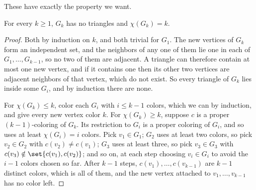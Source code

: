\begin{figure}[H]
    \centering
\end{figure}

These have exactly the property we want.

\begin{boxproposition} \label{Ch1:Prop:Zykov}
    For every $k \geq 1$, $G_k$ has no triangles and $\chi(G_k) = k$.
\end{boxproposition}
\begin{proof}
    Both by induction on $k$, and both trivial for $G_1$. The new vertices of $G_k$ form an independent set, and the neighbors of any one of them lie one in each of $G_1, \ldots, G_{k-1}$, so no two of them are adjacent. A triangle can therefore contain at most one new vertex, and if it contains one then its other two vertices are adjacent neighbors of that vertex, which do not exist. So every triangle of $G_k$ lies inside some $G_i$, and by induction there are none.

    For $\chi(G_k) \leq k$, color each $G_i$ with $i \leq k - 1$ colors, which we can by induction, and give every new vertex color $k$. For $\chi(G_k) \geq k$, suppose $c$ is a proper $(k-1)$-coloring of $G_k$. Its restriction to $G_i$ is a proper coloring of $G_i$, and so uses at least $\chi(G_i) = i$ colors. Pick $v_1 \in G_1$; $G_2$ uses at least two colors, so pick $v_2 \in G_2$ with $c(v_2) \neq c(v_1)$; $G_3$ uses at least three, so pick $v_3 \in G_3$ with $c(v_3) \notin \set{c(v_1), c(v_2)}$; and so on, at each step choosing $v_i \in G_i$ to avoid the $i - 1$ colors chosen so far. After $k - 1$ steps, $c(v_1), \ldots, c(v_{k-1})$ are $k - 1$ distinct colors, which is all of them, and the new vertex attached to $v_1, \ldots, v_{k-1}$ has no color left.
\end{proof}

